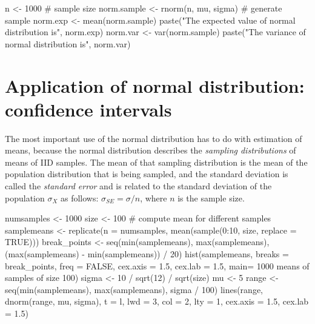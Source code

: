 \documentclass[
  letterpaper,
  DIV=11,
  numbers=noendperiod]{scrreprt}
\newenvironment{Shaded}{\begin{snugshade}}{\end{snugshade}}
\newcommand{\NormalTok}[1]{\textcolor[rgb]{0.00,0.23,0.31}{#1}}
\begin{document}
\begin{Shaded}
\begin{Highlighting}[]
\NormalTok{n \textless{}{-} 1000 \# sample size}
\NormalTok{norm.sample \textless{}{-} rnorm(n, mu, sigma) \# generate sample}
\NormalTok{norm.exp \textless{}{-} mean(norm.sample)}
\NormalTok{paste("The expected value of normal distribution is", norm.exp)}
\NormalTok{norm.var \textless{}{-} var(norm.sample)}
\NormalTok{paste("The variance of normal distribution is", norm.var)}
\end{Highlighting}
\end{Shaded}

\section{Application of normal distribution: confidence
intervals}\label{application-of-normal-distribution-confidence-intervals}

The most important use of the normal distribution has to do with
estimation of means, because the normal distribution describes the
\emph{sampling distributions} of means of IID samples. The mean of that
sampling distribution is the mean of the population distribution that is
being sampled, and the standard deviation is called the \emph{standard
error} and is related to the standard deviation of the population
\(\sigma_X\) as follows: \(\sigma_{SE} = \sigma/n\), where \(n\) is the
sample size.

\begin{Shaded}
\begin{Highlighting}[]
\NormalTok{numsamples \textless{}{-} 1000}
\NormalTok{size \textless{}{-} 100}
\NormalTok{\# compute mean for different samples}
\NormalTok{samplemeans \textless{}{-} replicate(n = numsamples, mean(sample(0:10, size, replace = TRUE)))}
\NormalTok{break\_points \textless{}{-} seq(min(samplemeans), max(samplemeans), }
\NormalTok{                    (max(samplemeans) {-} min(samplemeans)) / 20)}
\NormalTok{hist(samplemeans, breaks = break\_points, freq = FALSE, }
\NormalTok{     cex.axis = 1.5, cex.lab = 1.5,}
\NormalTok{     main= \textquotesingle{}1000 means of samples of size 100\textquotesingle{})}
\NormalTok{sigma \textless{}{-} 10 / sqrt(12) / sqrt(size)}
\NormalTok{mu \textless{}{-} 5}
\NormalTok{range \textless{}{-} seq(min(samplemeans), max(samplemeans), sigma / 100)}
\NormalTok{lines(range, }
\NormalTok{      dnorm(range, mu, sigma),}
\NormalTok{      t = \textquotesingle{}l\textquotesingle{}, lwd = 3, col = 2, lty = 1, cex.axis = 1.5, cex.lab = 1.5)}
\end{Highlighting}
\end{Shaded}
\end{document}
